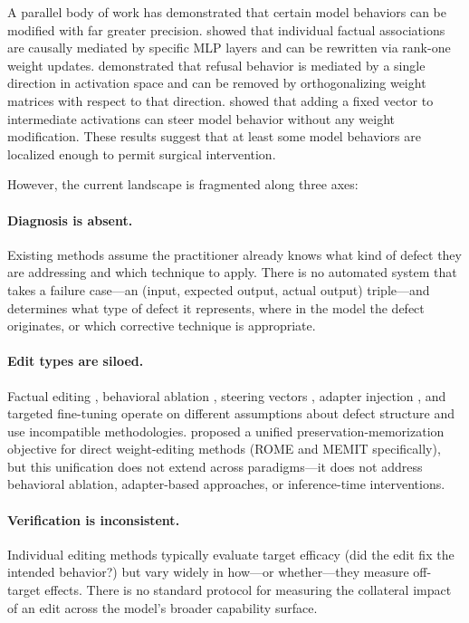 \documentclass[11pt]{article}
\begin{document}
A parallel body of work has demonstrated that certain model behaviors can be modified with far greater precision. \citet{meng2022locating} showed that individual factual associations are causally mediated by specific MLP layers and can be rewritten via rank-one weight updates. \citet{arditi2024refusal} demonstrated that refusal behavior is mediated by a single direction in activation space and can be removed by orthogonalizing weight matrices with respect to that direction. \citet{turner2023steering} showed that adding a fixed vector to intermediate activations can steer model behavior without any weight modification. These results suggest that at least some model behaviors are localized enough to permit surgical intervention.

However, the current landscape is fragmented along three axes:

\paragraph{Diagnosis is absent.} Existing methods assume the practitioner already knows what kind of defect they are addressing and which technique to apply. There is no automated system that takes a failure case---an (input, expected output, actual output) triple---and determines what type of defect it represents, where in the model the defect originates, or which corrective technique is appropriate.

\paragraph{Edit types are siloed.} Factual editing \citep{meng2022locating,meng2023mass}, behavioral ablation \citep{arditi2024refusal}, steering vectors \citep{turner2023steering}, adapter injection \citep{houlsby2019parameter,hu2022lora}, and targeted fine-tuning operate on different assumptions about defect structure and use incompatible methodologies. \citet{gupta2024unified} proposed a unified preservation-memorization objective for direct weight-editing methods (ROME and MEMIT specifically), but this unification does not extend across paradigms---it does not address behavioral ablation, adapter-based approaches, or inference-time interventions.

\paragraph{Verification is inconsistent.} Individual editing methods typically evaluate target efficacy (did the edit fix the intended behavior?) but vary widely in how---or whether---they measure off-target effects. There is no standard protocol for measuring the collateral impact of an edit across the model's broader capability surface.
\end{document}
